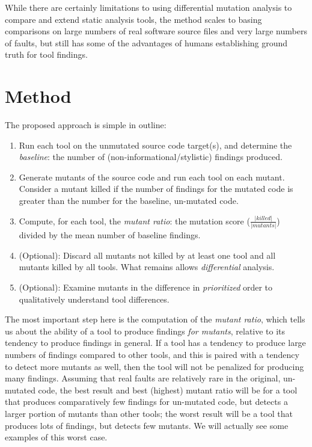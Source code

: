  While there are certainly limitations to using differential mutation analysis to compare and extend static analysis tools, the method scales to basing comparisons on large numbers of real software source files and very large numbers of faults, but still has some of the advantages of humans establishing ground truth for tool findings.

\section{Method}

The proposed approach is simple in outline:

\begin{enumerate}
\item Run each tool on the unmutated source code target(s), and determine the \emph{baseline}: the number of (non-informational/stylistic) findings produced.
\item Generate mutants of the source code and run each tool on each mutant.  Consider a mutant killed if the number of findings for the mutated code is greater than the number for the baseline, un-mutated code.
\item Compute, for each tool, the \emph{mutant ratio}:  the mutation score ($\frac{|\mathit{killed}|}{|\mathit{mutants}|}$) divided by the mean number of baseline findings.
\item (Optional): Discard all mutants not killed by at least one tool and all mutants killed by all tools.  What remains allows \emph{differential} analysis.
\item (Optional): Examine mutants in the difference in \emph{prioritized} order to qualitatively understand tool differences.
\end{enumerate}

The most important step here is the computation of the \emph{mutant ratio}, which tells us about the ability of a tool to produce findings \emph{for mutants}, relative to its tendency to produce findings in general.  If a tool has a tendency to produce large numbers of findings compared to other tools, and this is paired with a tendency to detect more mutants as well, then the tool will not be penalized for producing many findings.  Assuming that real faults are relatively rare in the original, un-mutated code, the best result and best (highest) mutant ratio will be for a tool that produces comparatively few findings for un-mutated code, but detects a larger portion of mutants than other tools; the worst result will be a tool that produces lots of findings, but detects few mutants.  We will actually see some examples of this worst case.

